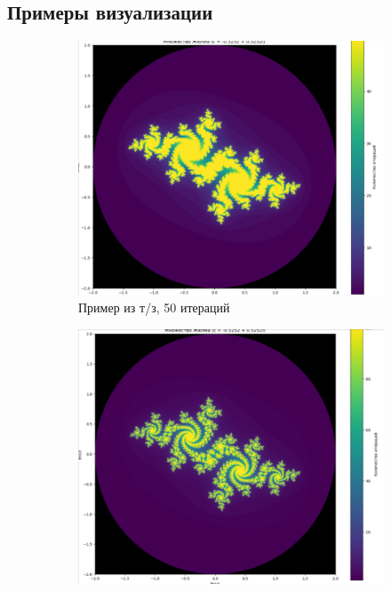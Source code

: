 \subsection{Примеры визуализации}

\begin{figure}[H]
    \captionsetup[subfigure]{labelformat=empty, justification=centering}
    \centering
    \begin{subfigure}{0.4\textwidth}
        \includegraphics[width=\textwidth]{plots/J3.png}
        \caption{Пример из т/з, 50 итераций}
    \end{subfigure}
    \hspace{1.7cm}
    \begin{subfigure}{0.4\textwidth}
        \includegraphics[width=\textwidth]{plots/J4.png}

\end{subfigure}
\end{figure}
